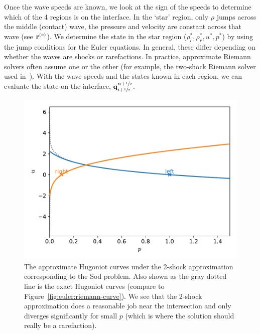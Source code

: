 Once the wave speeds are known, we look at the sign of the speeds to
determine which of the 4 regions is on the interface.  In the `star'
region, only $\rho$ jumps across the middle (contact) wave, the
pressure and velocity are constant across that wave (see ${\bf r}^{(\circ)}$).
We determine the state in the star region ($\rho_l^*, \rho_r^*, u^*,
p^*$) by using the jump conditions for the Euler equations.  In
general, these differ depending on whether the waves are shocks or
rarefactions.  In practice, approximate Riemann solvers often assume
one or the other (for example, the two-shock Riemann solver used
in~\cite{colellaglaz:1985}).  With the wave speeds and the states
known in each region, we can evaluate the state on the interface,
${\bf q}_{i+{\sfrac{1}{2}}}^{n+{\sfrac{1}{2}}}$.

\begin{figure}[t]
\centering
\includegraphics[width=0.9\linewidth]{riemann-2shock-sod-phase}
\caption[The approximate (2-shock) Hugoniot curves corresponding to
  the Sod problem]{\label{fig:euler:riemann-2shock-curve} The
  approximate Hugoniot curves under the 2-shock approximation
  corresponding to the Sod problem.  Also shown as the gray dotted
  line is the exact Hugoniot curves (compare to
  Figure~\ref{fig:euler:riemann-curve}).  We see that the 2-shock
  approximation does a reasonable job near the intersection and only
  diverges significantly for small $p$ (which is where the solution
  should really be a
  rarefaction).\\ 
  }
\end{figure}



